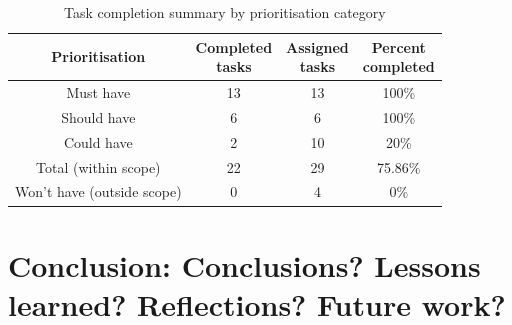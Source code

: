 \documentclass{vgtc}                          %
\begin{document}
\begin{table}[H]
    \centering
    \begin{tabular}{|c|c|c|c|}
        \hline
        Prioritisation & 
        \makecell{Completed\\tasks} & 
        \makecell{Assigned\\tasks} & 
        \makecell{Percent\\completed} \\
        \hline
        Must have & 13 & 13 & 100\% \\
        Should have & 6 & 6 & 100\% \\
        Could have & 2 & 10 & 20\% \\
        \hline
        Total (within scope)& 22 & 29 & 75.86\% \\
        \hline
        Won't have (outside scope)& 0 & 4 & 0\% \\
        \hline
    \end{tabular}
    \caption{Task completion summary by prioritisation category}
    \label{tab:completion_summary}
\end{table}

\section{Conclusion: Conclusions? Lessons learned? Reflections? Future work?}

%

%
%
%


\end{document}
